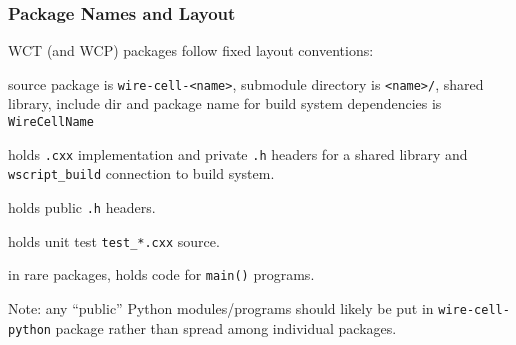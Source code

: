 \documentclass[xcolor=dvipsnames]{beamer}
\begin{document}
\begin{frame}[fragile]
  \frametitle{Package Names and Layout}

  WCT (and WCP) packages follow fixed layout conventions:

  \begin{description}\footnotesize
  \item[name] source package is \texttt{wire-cell-<name>}, submodule
    directory is \texttt{<name>/}, shared library, include dir and package name for
    build system dependencies is \texttt{WireCellName}
  \item[\texttt{src/}] holds \texttt{.cxx} implementation and private
    \texttt{.h} headers for a shared library and \verb|wscript_build|
    connection to build system.
  \item[\texttt{inc/WireCellName/}] holds public \texttt{.h} headers.
  \item[\texttt{test/}] holds unit test \verb|test_*.cxx| source.
  \item[\texttt{apps/}] in rare packages, holds code for
    \texttt{main()} programs.
  \end{description}

  \vfill

  \footnotesize Note: any ``public'' Python modules/programs should
  likely be put in \texttt{wire-cell-python} package rather than
  spread among individual packages.

\end{frame}
\end{document}

